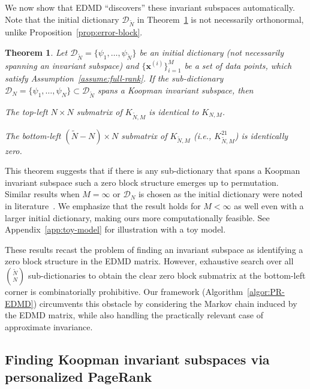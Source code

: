 \documentclass{article}
\theoremstyle{plain}
\newtheorem{theorem}{Theorem}
\theoremstyle{definition}
\def\by{\times}
\def\Dc{\mathcal{D}}
\newcommand{\arXivtag}[1][]{#1}
\begin{document}
	We now show that EDMD ``discovers'' these invariant subspaces automatically. Note that the initial dictionary $\Dc_{\tilde{N}}$ in Theorem~\ref{thm:blockstr} is not necessarily orthonormal, \arXivtag[unlike Proposition~\ref{prop:error-block}].
	\begin{theorem}\label{thm:blockstr}
		Let $\Dc_{\tilde{N}} = \{\psi_1, \ldots, \psi_{\tilde N}\}$ be an initial dictionary (not necessarily spanning an invariant subspace) and $\{\mathbf{x}^{(i)}\}_{i=1}^M$ be a set of data points, which satisfy Assumption~\ref{assume:full-rank}. 
		If the sub-dictionary $\Dc_N = \{\psi_1, \ldots, \psi_N\} \subset \Dc_{\tilde{N}}$ spans a Koopman invariant subspace, then 
		\vspace{-0.2cm}
		\begin{description}[itemsep=0.5cm, itemsep=-0.2cm]
			\item[(i)] The top-left $N \by N$ submatrix of $K_{\tilde{N},M}$ is identical to  $K_{N,M}$.
			\item[(ii)] The bottom-left $(\tilde{N} - N) \by N$ submatrix of $K_{\tilde{N},M}$ (i.e., $K_{\tilde{N},M}^{21}$) is identically zero. 
		\end{description}
	\end{theorem}	
	This theorem suggests that if there is any sub-dictionary that spans a Koopman invariant subspace such a zero block structure emerges up to permutation. Similar results when $M=\infty$ or $\Dc_N$ is chosen as the initial dictionary were noted in literature~\cite{williams2015data, Klus2016JCompDyn, korda2018convergence, mezic2021koopman}. We emphasize that the result holds for $M<\infty$ as well even with a larger initial dictionary, making ours more computationally feasible. See Appendix~\ref{app:toy-model} for illustration with a toy model. 
	
	\arXivtag[These results recast the problem of finding an invariant subspace as identifying a zero block structure in the EDMD matrix. However, exhaustive search over all $\binom{\tilde{N}}{N}$ sub-dictionaries to obtain the clear zero block submatrix at the bottom-left corner is combinatorially prohibitive. 
    Our framework (Algorithm~\ref{algor:PR-EDMD}) circumvents this obstacle by considering the Markov chain induced by the EDMD matrix, while also handling the practically relevant case of approximate invariance.]
    
	\vspace{-0.1cm}
	\subsection{Finding Koopman invariant subspaces via personalized PageRank}\label{subsec:block-theory}
	
\end{document}
